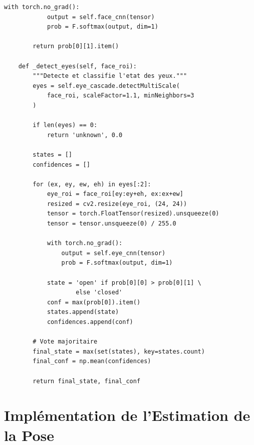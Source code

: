 \begin{lstlisting}[style=pythonstyle, caption={Module de détection visage et yeux.}, label={lst:face_detection}]
        with torch.no_grad():
            output = self.face_cnn(tensor)
            prob = F.softmax(output, dim=1)
        
        return prob[0][1].item()
    
    def _detect_eyes(self, face_roi):
        """Detecte et classifie l'etat des yeux."""
        eyes = self.eye_cascade.detectMultiScale(
            face_roi, scaleFactor=1.1, minNeighbors=3
        )
        
        if len(eyes) == 0:
            return 'unknown', 0.0
        
        states = []
        confidences = []
        
        for (ex, ey, ew, eh) in eyes[:2]:
            eye_roi = face_roi[ey:ey+eh, ex:ex+ew]
            resized = cv2.resize(eye_roi, (24, 24))
            tensor = torch.FloatTensor(resized).unsqueeze(0)
            tensor = tensor.unsqueeze(0) / 255.0
            
            with torch.no_grad():
                output = self.eye_cnn(tensor)
                prob = F.softmax(output, dim=1)
            
            state = 'open' if prob[0][0] > prob[0][1] \
                    else 'closed'
            conf = max(prob[0]).item()
            states.append(state)
            confidences.append(conf)
        
        # Vote majoritaire
        final_state = max(set(states), key=states.count)
        final_conf = np.mean(confidences)
        
        return final_state, final_conf
\end{lstlisting}

\section{Implémentation de l'Estimation de la Pose}

